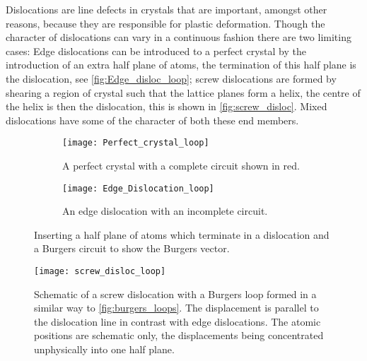 

Dislocations are line defects in crystals that are important, amongst other reasons, because they are responsible for plastic deformation. Though the character of dislocations can vary in a continuous fashion there are two limiting cases: Edge dislocations can be introduced to a perfect crystal by the introduction of an extra half plane of atoms, the termination of this half plane is the dislocation, see \autoref{fig:Edge_disloc_loop}; screw dislocations are formed by shearing a region of crystal such that the lattice planes form a helix, the centre of the helix is then the dislocation, this is shown in \autoref{fig:screw_disloc}. Mixed dislocations have some of the character of both these end members.



\begin{figure}
\centering

\begin{subfigure}{0.4\textwidth}
\centering
\texttt{[image: Perfect\_crystal\_loop]}
\caption{A perfect crystal with a complete circuit shown in red.}
\end{subfigure}
\begin{subfigure}{0.4\textwidth}
\centering
\texttt{[image: Edge\_Dislocation\_loop]}
\caption{An edge dislocation with an incomplete circuit. \label{fig:Edge_disloc_loop}}
\end{subfigure}

\caption[A Burgers loop around an edge dislocation.]{Inserting a half plane of atoms which terminate in a dislocation and a Burgers circuit to show the Burgers vector. \label{fig:burgers_loops}}

\end{figure}

\begin{figure}
\centering
{}
\texttt{[image: screw\_disloc\_loop]}
\caption[A Burgers loop around a screw dislocation.]{Schematic of a screw dislocation with a Burgers loop formed in a similar way to \autoref{fig:burgers_loops}. The displacement is parallel to the dislocation line in contrast with edge dislocations. The atomic positions are schematic only, the displacements being concentrated unphysically into one half plane. \label{fig:screw_disloc}}
\end{figure}




